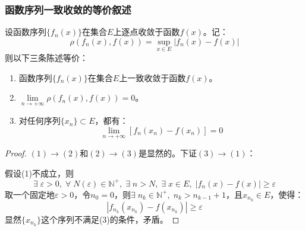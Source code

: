 \subsubsection{函数序列一致收敛的等价叙述}
\begin{theorem}
	设函数序列$\{f_n(x)\}$在集合$E$上逐点收敛于函数$f(x)$。记：
	\begin{equation*}
		\rho(f_n(x),f(x))=\sup_{x\in E}|f_n(x)-f(x)|
	\end{equation*}
	则以下三条陈述等价：
	\begin{enumerate}
		\item 函数序列$\{f_n(x)\}$在集合$E$上一致收敛于函数$f(x)$。
		\item $\lim\limits_{n\to+\infty}\rho(f_n(x),f(x))=0$。
		\item 对任何序列$\{x_n\}\subset E$，都有：
		\begin{equation*}
			\lim_{n\to+\infty}[f_n(x_n)-f(x_n)]=0
		\end{equation*}
	\end{enumerate}
\end{theorem}
\begin{proof}
	$(1)\rightarrow(2)$和$(2)\rightarrow(3)$是显然的。下证$(3)\rightarrow(1)$：\par
	假设(1)不成立，则
	\begin{equation*}
		\exists\;\varepsilon>0,\;\forall\;N(\varepsilon)\in\mathbb{N}^+,\;\exists\;n>N,\;\exists\;x\in E,\;|f_n(x)-f(x)|\geqslant\varepsilon
	\end{equation*}
	取一个固定地$\varepsilon>0$，令$n_0=0$，则$\exists\;n_k\in\mathbb{N}^+,\;n_k>n_{k-1}+1$，且$x_{n_k}\in E$，使得：
	\begin{equation*}
		|f_{n_k}(x_{n_k})-f(x_{n_k})|\geqslant\varepsilon
	\end{equation*}
	显然$\{x_{n_k}\}$这个序列不满足(3)的条件，矛盾。
\end{proof}
